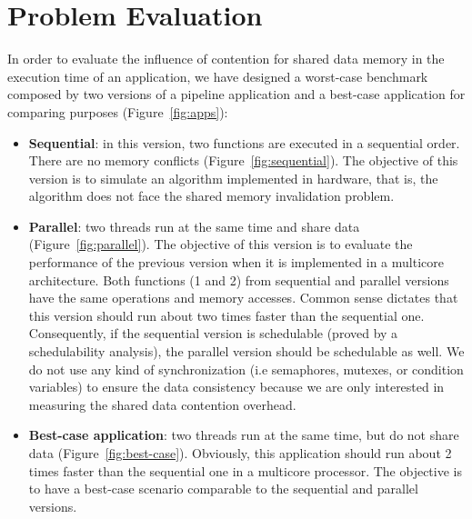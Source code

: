 \documentclass[conference]{IEEEtran}
\begin{document}
\section{Problem Evaluation}
\label{sec:benchmark}

In order to evaluate the influence of contention for shared data memory in the execution time of an application, we have designed a worst-case benchmark composed by two versions of a pipeline application and a best-case application for comparing purposes (Figure~\ref{fig:apps}):

\begin{itemize}
 \item \textbf{Sequential}: in this version, two functions are executed in a sequential order. There are no memory conflicts (Figure~\ref{fig:sequential}). The objective of this version is to simulate an algorithm implemented in hardware, that is, the algorithm does not face the shared memory invalidation problem.

 \item \textbf{Parallel}: two threads run at the same time and share data (Figure~\ref{fig:parallel}). The objective of this version is to evaluate the performance of the previous version when it is implemented in a multicore architecture. Both functions (1 and 2) from sequential and parallel versions have the same operations and memory accesses. Common sense dictates that this version should run about two times faster than the sequential one. Consequently, if the sequential version is schedulable (proved by a schedulability analysis), the parallel version should be schedulable as well. We do not use any kind of synchronization (i.e semaphores, mutexes, or condition variables) to ensure the data consistency because we are only interested in measuring the shared data contention overhead.

 \item \textbf{Best-case application}: two threads run at the same time, but do not share data (Figure~\ref{fig:best-case}). Obviously, this application should run about 2 times faster than the sequential one in a multicore processor. The objective is to have a best-case scenario comparable to the sequential and parallel versions.
\end{itemize}
\end{document}
